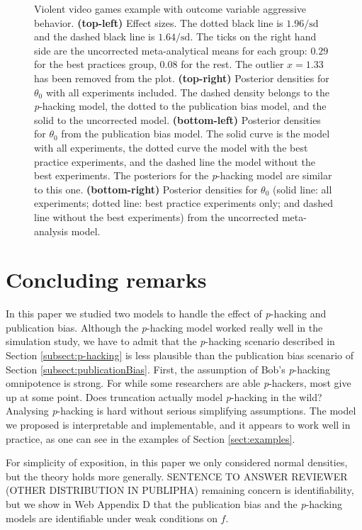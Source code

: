 \documentclass[useAMS,usenatbib,referee]{biom}
\begin{document}
\begin{figure}
\caption{\label{fig:anderson2010}Violent video games example with outcome variable aggressive behavior. \textbf{(top-left)} Effect sizes. The dotted black line is $1.96/\textrm{sd}$ and the dashed black line is $1.64/\textrm{sd}$. The ticks on the right hand side are the uncorrected meta-analytical means for each group: $0.29$ for the best practices group, $0.08$ for the rest. The outlier $x=1.33$ has been removed from the plot.
\textbf{(top-right)} Posterior densities for $\theta_{0}$ with all experiments included. The dashed density belongs to the \textit{p}-hacking model, the dotted to the publication bias model, and the solid to the uncorrected model. \textbf{(bottom-left)} Posterior densities for $\theta_{0}$ from the publication bias model. The solid curve is the model with all experiments, the dotted curve the model with the best practice experiments, and the dashed line the model without the best experiments. The posteriors for the \textit{p}-hacking model are similar to this one. \textbf{(bottom-right)} Posterior densities for $\theta_{0}$ (solid line: all experiments; dotted line: best practice experiments only; and dashed line without the best experiments) from the uncorrected meta-analysis model.}
\end{figure}

\section{Concluding remarks}\label{sect:conclusions}

In this paper we studied two models to handle the effect of \textit{p}-hacking and publication bias. Although the \textit{p}-hacking model worked really well in the simulation study, we have to admit that the \textit{p}-hacking scenario described in Section \ref{subsect:p-hacking} is less plausible than the publication bias scenario of Section \ref{subsect:publicationBias}. First, the assumption of Bob's \textit{p}-hacking omnipotence is strong. For while some researchers are able \textit{p}-hackers, most give up at some point. Does truncation actually model \textit{p}-hacking in the wild? Analysing \textit{p}-hacking is hard without serious simplifying assumptions. The model we proposed is interpretable and implementable, and it appears to work well in practice, as one can see in the examples of Section \ref{sect:examples}. 

For simplicity of exposition, in this paper we only considered normal densities, but the theory holds more generally. SENTENCE TO ANSWER REVIEWER (OTHER DISTRIBUTION IN PUBLIPHA)  remaining concern is identifiability, but we show in Web Appendix D that the publication bias and the \textit{p}-hacking models are identifiable under weak conditions on $f$.
\end{document}
